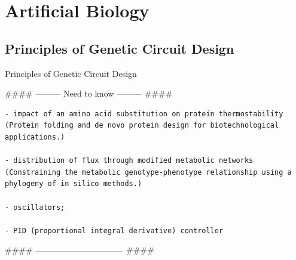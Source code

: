 \documentclass[
]{book}
\begin{document}
\hypertarget{artificial-biology}{%
\section{Artificial Biology}\label{artificial-biology}}

\hypertarget{principles-of-genetic-circuit-design}{%
\subsection{Principles of Genetic Circuit Design}\label{principles-of-genetic-circuit-design}}

Principles of Genetic Circuit Design

\#\#\#\# --------- Need to know --------- \#\#\#\#

\begin{verbatim}
- impact of an amino acid substitution on protein thermostability (Protein folding and de novo protein design for biotechnological applications.)

- distribution of flux through modified metabolic networks (Constraining the metabolic genotype-phenotype relationship using a phylogeny of in silico methods.)

- oscillators;

- PID (proportional integral derivative) controller
\end{verbatim}

\#\#\#\# -------------------------------- \#\#\#\#
\end{document}
